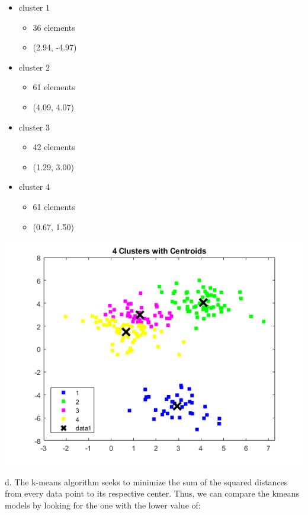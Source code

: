 \documentclass{article}
\begin{document}
\begin{itemize}
    \item cluster 1
    \begin{itemize}
        \item 36 elements
        \item (2.94, -4.97)
    \end{itemize}
    \item cluster 2
    \begin{itemize}
        \item 61 elements
        \item (4.09, 4.07)
    \end{itemize}
    \item cluster 3
    \begin{itemize}
        \item 42 elements
        \item (1.29, 3.00)
    \end{itemize}
    \item cluster 4
    \begin{itemize}
        \item 61 elements
        \item (0.67, 1.50)
    \end{itemize}
\end{itemize}

\begin{center}
    \includegraphics[scale=1]{1c.png}
\end{center}

\noindent
d. The k-means algorithm seeks to minimize the sum of the squared distances from every data point to its respective center. Thus, we can compare the kmeans models by looking for the one with the lower value of: 
\end{document}
